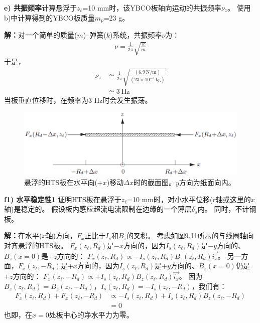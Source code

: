 \textbf{e) 共振频率}\qquad 计算悬浮于$z_\ell$=10 mm时，该YBCO板轴向运动的共振频率$\nu_z$。
使用b)中计算得到的YBCO板质量$m_p$=23 g。

\textbf{解：}对一个简单的质量($m$)--弹簧($k$)系统，共振频率$\nu$为：
\begin{align*}%
\nu=\frac{1}{2\pi}\sqrt{\frac{k}{m}}
\end{align*}
于是，
\begin{align*}%
\nu_{z}&\simeq\frac{1}{2\pi}\sqrt{\frac{(6.9\ \mathrm{N/m})}{(23\times 10^{-3}\ \mathrm{kg})}}\\
&\simeq 3\ \mathrm{Hz}
\end{align*}
当板垂直位移时，在频率为3 Hz时会发生振荡。

\begin{figure}
	\centering
	\includegraphics[scale=0.6]{chpt9/figs/fig9.14.eps}
	\caption{悬浮的HTS板在水平向($+x$)移动$\Delta x$时的截面图。$y$方向为纸面向内。}
\end{figure}

\textbf{f1) 水平稳定性1}\qquad
证明HTS板在悬浮于$z_\ell$=10 mm时，对小水平位移($r$轴或这里的$x$轴)是稳定的。
假设板内感应超流电流限制在边缘的一个薄层$\delta_s$内。
同时，不计钢板。

\textbf{解：}在水平($x$轴)方向，$F_x$正比于$I_s$和$B_z$的叉积。
考虑如图9.11所示的与线圈轴向对齐悬浮的HTS板。
$F_x(z_\ell,R_d)$是$-x$方向的，因为$I_s(z_\ell,R_d)$是$-y$方向的、$B_z(x=0)$是$+z$方向的：
$F_x(z_\ell,R_d)\propto -I_s(z_\ell,R_d)B_z(z_\ell,R_d)\vec{i_x}$。
另一方面，$F_x(z_\ell,-R_d)$是$+x$方向的，因为$I_s(z_\ell,R_d)$是$+y$方向的、$B_z(x=0)$仍是$+z$方向的：
$F_x(z_\ell,-R_d)\propto +I_s(z_\ell,R_d)B_z(z_\ell,R_d)\vec{i_x}$。
因为$B_z(z_\ell,R_d)=B_z(z_\ell,-R_d)$，$I_s(z_\ell,R_d)=-I_s(z_\ell,-R_d)$，我们有：
\begin{align*}%
F_{x}(z_{\ell},R_{d})+F_{x}(z_{\ell},-R_{d})&\propto-I_{s}(z_{\ell},R_{d})+I_{s}(z_{\ell},R_{d})B_{z}(z_{\ell},-R_{d})\\
&=0
\end{align*}
也即，在$x=0$处板中心的净水平力为零。

